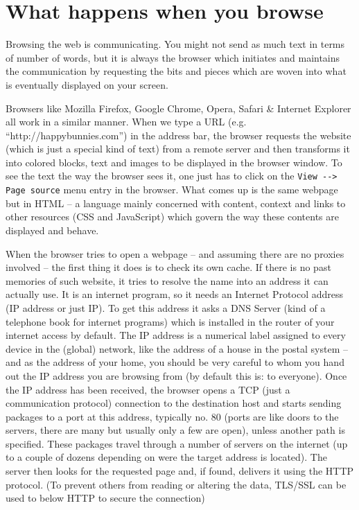 \section{What happens when you browse}

Browsing the web is communicating. You might not send as much text in
terms of number of words, but it is always the browser which initiates
and maintains the communication by requesting the bits and pieces which
are woven into what is eventually displayed on your screen.

Browsers like Mozilla Firefox, Google Chrome, Opera, Safari \& Internet
Explorer all work in a similar manner. When we type a URL (e.g.
``http://happybunnies.com'') in the address bar, the browser requests
the website (which is just a special kind of text) from a remote server
and then transforms it into colored blocks, text and images to be
displayed in the browser window. To see the text the way the browser
sees it, one just has to click on the \verb!View --> Page source! menu
entry in the browser. What comes up is the same webpage but in HTML -- a
language mainly concerned with content, context and links to other
resources (CSS and JavaScript) which govern the way these contents are
displayed and behave.

When the browser tries to open a webpage -- and assuming there are no
proxies involved -- the first thing it does is to check its own cache.
If there is no past memories of such website, it tries to resolve the
name into an address it can actually use. It is an internet program, so
it needs an Internet Protocol address (IP address or just IP). To get
this address it asks a DNS Server (kind of a telephone book for internet
programs) which is installed in the router of your internet access by
default. The IP address is a numerical label assigned to every device in
the (global) network, like the address of a house in the postal system
-- and as the address of your home, you should be very careful to whom
you hand out the IP address you are browsing from (by default this is:
to everyone). Once the IP address has been received, the browser opens a
TCP (just a communication protocol) connection to the destination host
and starts sending packages to a port at this address, typically no. 80
(ports are like doors to the servers, there are many but usually only a
few are open), unless another path is specified. These packages travel
through a number of servers on the internet (up to a couple of dozens
depending on were the target address is located). The server then looks
for the requested page and, if found, delivers it using the HTTP
protocol. (To prevent others from reading or altering the data, TLS/SSL
can be used to below HTTP to secure the connection)

